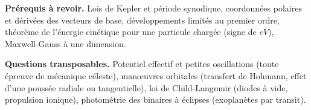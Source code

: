 \documentclass[11pt,a4paper]{article}
\begin{document}
\textbf{Prérequis à revoir.} Lois de Kepler et période synodique, coordonnées polaires et dérivées des vecteurs de base, développements limités au premier ordre, théorème de l'énergie cinétique pour une particule chargée (signe de \(eV\)), Maxwell-Gauss à une dimension.

\textbf{Questions transposables.} Potentiel effectif et petites oscillations (toute épreuve de mécanique céleste), manœuvres orbitales (transfert de Hohmann, effet d'une poussée radiale ou tangentielle), loi de Child-Langmuir (diodes à vide, propulsion ionique), photométrie des binaires à éclipses (exoplanètes par transit).
\end{document}
